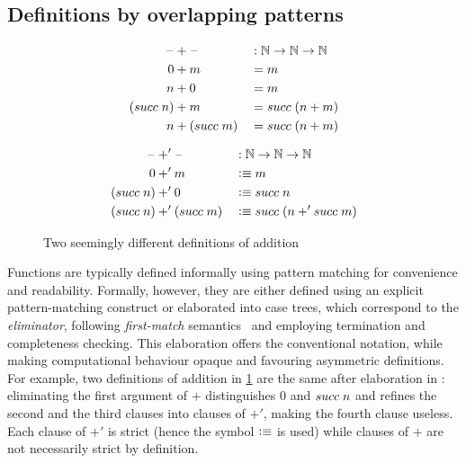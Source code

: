 \documentclass[a4paper,UKenglish,numberwithinsect,cleveref,thm-restate]{lipics-v2021}
\begin{document}


\subsection{Definitions by overlapping patterns} \label{sec:meta:overlapping}
\begin{figure} 
\begin{minipage}[t]{.48\textwidth}
  \begin{alignat*}{5}
    \blank  & + \blank     && : \N \to \N \to \N \\
    0       &  + m         && = m  \\
  n         &  + 0         && = m  \\
  (\suc\;n) &  + m         && = \suc\;(n + m) \\
  n         &  + (\suc\;m) && = \suc\;(n + m)
\end{alignat*}
\end{minipage}
\begin{minipage}[t]{.5\textwidth}
\begin{alignat*}{5}
  \blank         & +'\blank     && : \N \to \N \to \N \\
  0              & +' m         && \defeq m  \\
  (\suc\;n)      & +' 0         && \defeq \suc\;n \\
  (\suc\;n)      & +' (\suc\;m) && \defeq \suc\;(n +' \suc\;m)
\end{alignat*}
\end{minipage}
\caption{Two seemingly different definitions of addition}
\label{fig:additions}
\end{figure}
Functions are typically defined informally using pattern matching for convenience and readability. Formally, however, they are either defined using an explicit pattern-matching construct or elaborated into case trees, which correspond to the \emph{eliminator}, following \emph{first-match} semantics~\cite{Cockx2020a} and employing termination and completeness checking.
This elaboration offers the conventional notation, while making computational behaviour opaque and favouring asymmetric definitions.
For example, two definitions of addition in \cref{fig:additions} are the same
after elaboration in \Agda: eliminating the first argument of $+$ distinguishes $0$ and $\suc\;n$ and refines the second and the third clauses into clauses of $+'$, making the fourth clause useless.
Each clause of $+'$ is strict (hence the symbol $\vcentcolon\equiv$ is used) while clauses of $+$ are not necessarily strict by definition.
\end{document}
